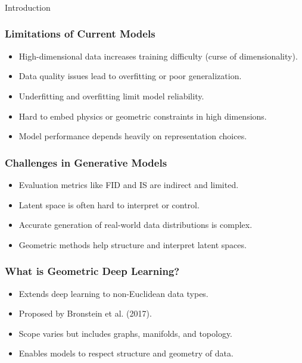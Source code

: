 \begin{frame}[fragile]\frametitle{}
\begin{center}
{\Large Introduction}
\end{center}
\end{frame}

\begin{frame}[fragile]\frametitle{Limitations of Current Models}
  \begin{itemize}
    \item High-dimensional data increases training difficulty (curse of dimensionality).
    \item Data quality issues lead to overfitting or poor generalization.
    \item Underfitting and overfitting limit model reliability.
    \item Hard to embed physics or geometric constraints in high dimensions.
    \item Model performance depends heavily on representation choices.
  \end{itemize}
\end{frame}

\begin{frame}[fragile]\frametitle{Challenges in Generative Models}
  \begin{itemize}
    \item Evaluation metrics like FID and IS are indirect and limited.
    \item Latent space is often hard to interpret or control.
    \item Accurate generation of real-world data distributions is complex.
    \item Geometric methods help structure and interpret latent spaces.
  \end{itemize}
\end{frame}

\begin{frame}[fragile]\frametitle{What is Geometric Deep Learning?}
  \begin{itemize}
    \item Extends deep learning to non-Euclidean data types.
    \item Proposed by Bronstein et al. (2017).
    \item Scope varies but includes graphs, manifolds, and topology.
    \item Enables models to respect structure and geometry of data.
  \end{itemize}
\end{frame}

